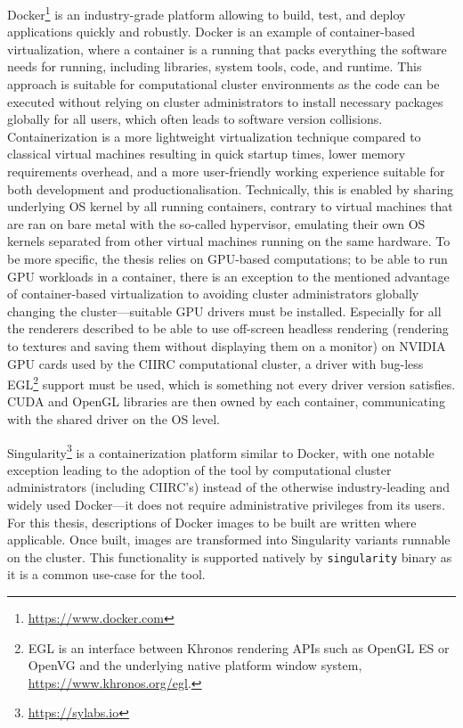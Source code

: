 Docker\footnote{\url{https://www.docker.com}} is an industry-grade platform allowing to
build, test, and deploy applications quickly and robustly. Docker is an example of
container-based virtualization, where a container is a running  that packs
everything the software needs for running, including libraries, system tools, code, and
runtime. This approach is suitable for computational cluster environments as the code can
be executed without relying on cluster administrators to install necessary packages
globally for all users, which often leads to software version collisions.
Containerization is a more lightweight virtualization technique compared to classical
virtual machines resulting in quick startup times, lower memory requirements overhead, and
a more user-friendly working experience suitable for both development and
productionalisation. Technically, this is enabled by sharing underlying OS kernel by all
running containers, contrary to virtual machines that are ran on bare metal with the
so-called hypervisor, emulating their own OS kernels separated from other virtual machines
running on the same hardware. To be more specific, the thesis relies on GPU-based
computations; to be able to run GPU workloads in a container, there is an exception to the
mentioned advantage of container-based virtualization to avoiding cluster administrators
globally changing the cluster---suitable GPU drivers must be installed. Especially for all
the renderers described to be able to use off-screen headless rendering (rendering to
textures and saving them without displaying them on a monitor) on NVIDIA GPU cards used by
the CIIRC computational cluster, a driver with bug-less EGL\footnote{EGL is an interface
between Khronos rendering APIs such as OpenGL ES or OpenVG and the underlying native
platform window system, \url{https://www.khronos.org/egl}.} support must be used, which is
something not every driver version satisfies. CUDA and OpenGL libraries are then owned by
each container, communicating with the shared driver on the OS level.

Singularity\footnote{\url{https://sylabs.io}} is a containerization platform similar to
Docker, with one notable exception leading to the adoption of the tool by computational
cluster administrators (including CIIRC's) instead of the otherwise industry-leading and
widely used Docker---it does not require administrative privileges from its users. For
this thesis, descriptions of Docker images to be built are written where applicable. Once
built, images are transformed into Singularity variants runnable on the cluster. This
functionality is supported natively by \verb|singularity| binary as it is a common
use-case for the tool.


